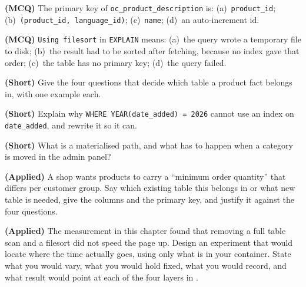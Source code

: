 \begin{reviewq}
  \item \textbf{(MCQ)} The primary key of \texttt{oc\_product\_description} is:
        (a)~\texttt{product\_id}; (b)~\texttt{(product\_id, language\_id)};
        (c)~\texttt{name}; (d)~an auto-increment id.
  \item \textbf{(MCQ)} \texttt{Using filesort} in \texttt{EXPLAIN} means:
        (a)~the query wrote a temporary file to disk; (b)~the result had to be
        sorted after fetching, because no index gave that order; (c)~the table
        has no primary key; (d)~the query failed.
  \item \textbf{(Short)} Give the four questions that decide which table a
        product fact belongs in, with one example each.
  \item \textbf{(Short)} Explain why \texttt{WHERE YEAR(date\_added) = 2026}
        cannot use an index on \texttt{date\_added}, and rewrite it so it can.
  \item \textbf{(Short)} What is a materialised path, and what has to happen
        when a category is moved in the admin panel?
  \item \textbf{(Applied)} A shop wants products to carry a ``minimum order
        quantity'' that differs per customer group. Say which existing table
        this belongs in or what new table is needed, give the columns and the
        primary key, and justify it against the four questions.
  \item \textbf{(Applied)} The measurement in this chapter found that removing
        a full table scan and a filesort did not speed the page up. Design an
        experiment that would locate where the time actually goes, using only
        what is in your container. State what you would vary, what you would
        hold fixed, what you would record, and what result would point at each
        of the four layers in .
\end{reviewq}
